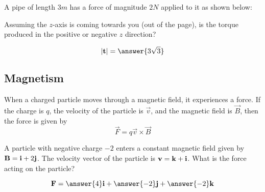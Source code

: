 \documentclass{ximera}
\begin{document}
\begin{question}
  A pipe of length $3 \unit{m}$ has a force of magnitude $2 \unit{N}$
  applied to it as shown below:
  \begin{image}
  \end{image}
  Assuming the $z$-axis is coming towards you (out of the page), is
  the torque produced in the positive or negative $z$ direction?
  \begin{prompt}
  \begin{multipleChoice}
  \end{multipleChoice}  
  \[
  |\vec{t}| = \answer{3\sqrt{3}}
  \]
  \end{prompt}
\end{question}



\subsection{Magnetism} 

When a charged particle moves through a magnetic field, it experiences
a force.  If the charge is $q$, the velocity of the particle is
$\vec{v}$, and the magnetic field is $\vec{B}$, then the force is
given by
\[
\vec{F} = q\vec{v} \times \vec{B}
\]

\begin{question}
  A particle with negative charge $-2$ enters a constant magnetic
  field given by $\mathbf{B} = \mathbf{i}+2\mathbf{j}$.  The velocity vector of
  the particle is $\mathbf{v} = \mathbf{k}+\mathbf{i}$.  What is the force
  acting on the particle?
  \begin{prompt}
  \[
  \vec{F} = \answer{4}\vec{i}+\answer{-2}\vec{j}+\answer{-2}\vec{k}
  \]
  \end{prompt}
\end{question}
\end{document}
